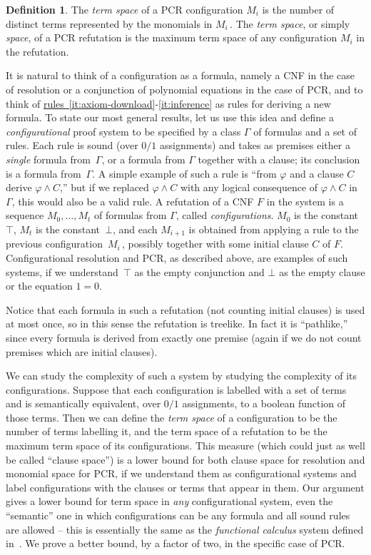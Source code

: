 \documentclass[11pt]{article}
\numberwithin{equation}{section}
\theoremstyle{definition}
\newtheorem{definition}[theorem]{Definition}
\theoremstyle{plain}
\newcommand{\expref}[2]{\hyperref[#2]{#1~\ref{#2}}}
\let\phi\varphi
\begin{document}
\begin{definition}
The \emph{term space} of a PCR configuration $M_i$ is the number of distinct
terms represented by the monomials in $M_i$\,.
The \emph{term space}, or simply \emph{space}, of a PCR refutation is the maximum
term space of any configuration $M_i$ in the refutation.
\end{definition}


It is natural to think of a configuration as a formula, namely
a CNF in the case of resolution or a conjunction of polynomial equations in the case of PCR,
and to think of \expref{rules}{it:axiom-download}-\ref{it:inference} as rules for deriving a new formula.
To state our most general results, let us use this idea and define a \emph{configurational} proof system
to be specified by a class $\Gamma$ of formulas and a set of rules.
Each rule is sound (over $0/1$ assignments) and takes as premises
either a \emph{single} formula from~$\Gamma$, or a formula from $\Gamma$ together with a clause;
its conclusion is a formula from~$\Gamma$.
A simple example of such a rule is
``from $\phi$ and a clause $C$ derive $\phi \wedge C$,''
but if we replaced $\phi \wedge C$ with any logical consequence
of $\phi \wedge C$ in $\Gamma$, this would also be 
a valid rule.
 A refutation of a CNF $F$ 
in the system
is a sequence $M_0, \dots, M_t$ of formulas from $\Gamma$, called \emph{configurations}.
$M_0$ is the constant~$\top$, $M_t$ is the constant~$\bot$, and each $M_{i+1}$ is obtained
from applying a rule to the previous configuration~$M_i$\,, possibly together with some initial clause $C$ of $F$.
Configurational resolution and PCR,
as described above, are examples of such systems, if we understand~$\top$ as the empty conjunction and $\bot$
as the empty clause or the equation $1=0$. 

Notice that each formula in such a  refutation (not counting initial
clauses) is used at most once, so in this sense the refutation
 is treelike. In fact it is ``pathlike,''
since every formula is derived from exactly one premise (again if we do not count premises which are initial clauses).



We can study the complexity of such a system by studying the complexity of
its configurations. Suppose that each configuration is  labelled with a set of terms 
and is semantically equivalent, over $0/1$ assignments,  to a boolean function of those terms. 
Then we can define the \emph{term space} of a configuration to be the 
number of terms labelling it, %
%
and the term space of a refutation to be the maximum term space of its configurations.
This measure (which could just as well be called ``clause space'')  %
%
%
%
%
%
is a lower bound for %
both clause space for resolution and monomial space for PCR, if we understand them
as configurational systems and label configurations with the clauses or terms that
appear in them.
Our argument gives a lower bound for term space in \emph{any} configurational system,
even the ``semantic'' one in which configurations can be any formula and all sound rules are allowed
-- this is essentially the same as the \emph{functional calculus} system defined 
in~\cite{ABRW}. We prove a better bound, by a factor of two, in the specific case of PCR.
\end{document}
